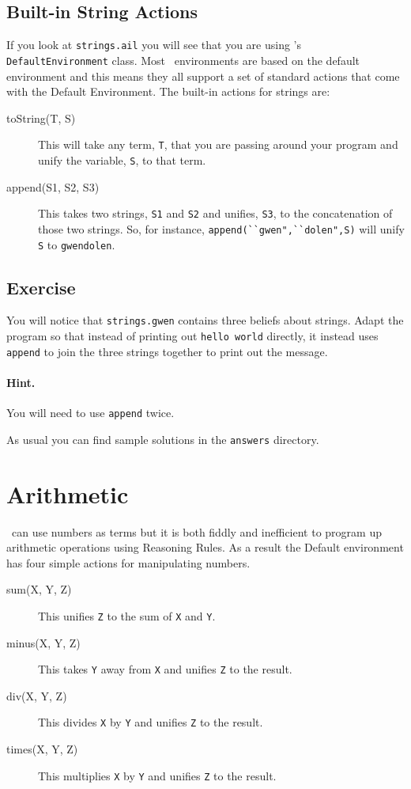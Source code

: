 \subsection{Built-in String Actions}
If you look at \texttt{strings.ail} you will see that you are using \ail's \texttt{DefaultEnvironment} class.  Most \gwendolen\ environments are based on the default environment and this means they all support a set of standard actions that come with the Default Environment.  The built-in actions for strings are:
\begin{description}
\item[toString(T, S)] This will take any term, \lstinline{T}, that you are passing around your program and unify the variable, \lstinline{S}, to that term.
\item[append(S1, S2, S3)]  This takes two strings, \lstinline{S1} and \lstinline{S2} and unifies, \lstinline{S3}, to the concatenation of those two strings.  So, for instance, \lstinline{append(``gwen",``dolen",S)} will unify \lstinline{S} to \lstinline{gwendolen}.
\end{description}

\subsection{Exercise}
You will notice that \texttt{strings.gwen} contains three beliefs about strings.  Adapt the program so that instead of printing out \texttt{hello world} directly, it instead uses \lstinline{append} to join the three strings together to print out the message.

\paragraph{Hint.} You will need to use \lstinline{append} twice.

As usual you can find sample solutions in the \texttt{answers} directory.

\section{Arithmetic}

\gwendolen\ can use numbers as terms but it is both fiddly and inefficient to program up arithmetic operations using Reasoning Rules.  As a result the Default environment has four simple actions for manipulating numbers.

\begin{description}
\item[sum(X, Y, Z)] This unifies \lstinline{Z} to the sum of \lstinline{X} and \lstinline{Y}.
\item[minus(X, Y, Z)] This takes \lstinline{Y} away from \lstinline{X} and unifies \lstinline{Z} to the result.
\item[div(X, Y, Z)] This divides \lstinline{X} by \lstinline{Y} and unifies \lstinline{Z} to the result.
\item[times(X, Y, Z)] This multiplies \lstinline{X} by \lstinline{Y} and unifies \lstinline{Z} to the result.
\end{description}

